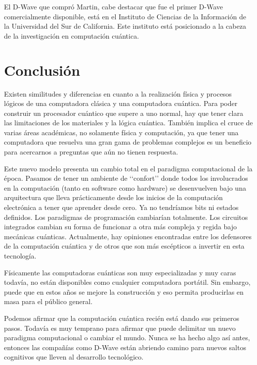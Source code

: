 \documentclass[11pt,a4paper]{article}
\begin{document}
El D-Wave que compró Martin, cabe destacar que fue el primer D-Wave comercialmente disponible, está en el Instituto de Ciencias de la Información de la Universidad del Sur de California. Este instituto está posicionado a la cabeza de la investigación en computación cuántica.

\clearpage
\part*{Conclusión}

Existen similitudes y diferencias en cuanto a la realización física y procesos lógicos de una computadora clásica y una computadora cuántica. Para poder construir un procesador cuántico que supere a uno normal, hay que tener clara las limitaciones de los materiales y la lógica cuántica. También implica el cruce de varias áreas académicas, no solamente física y computación, ya que tener una computadora que resuelva una gran gama de problemas complejos es un beneficio para acercarnos a preguntas que aún no tienen respuesta. 

Este nuevo modelo presenta un cambio total en el paradigma computacional de la época. Pasamos de tener un ambiente de ‘‘confort’’ donde todos los involucrados en la computación (tanto en software como hardware) se desenvuelven bajo una arquitectura que lleva prácticamente desde los inicios de la computación electrónica a tener que aprender desde cero. Ya no tendríamos bits ni estados definidos. Los paradigmas de programación cambiarían totalmente. Los circuitos integrados cambian su forma de funcionar a otra más compleja y regida bajo mecánicas cuánticas. Actualmente, hay opiniones encontradas entre los defensores de la computación cuántica y de otros que son más escépticos a invertir en esta tecnología.

Físicamente las computadoras cuánticas son muy especializadas y muy caras todavía, no están disponibles como cualquier computadora portátil. Sin embargo, puede que en estos años se mejore la construcción y eso permita producirlas en masa para el público general. 

Podemos afirmar que la computación cuántica recién está dando sus primeros pasos. Todavía es muy temprano para afirmar que puede delimitar un nuevo paradigma computacional o cambiar el mundo. Nunca se ha hecho algo así antes, entonces las compañías como D-Wave están abriendo camino para nuevos saltos cognitivos que lleven al desarrollo tecnológico. 
\end{document}
